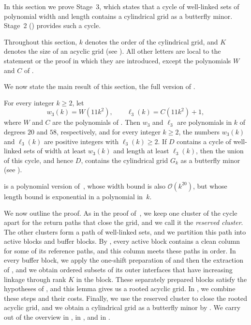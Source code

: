\documentclass[fontsize=12pt,leading=14pt]{fullpaper}
\newcounter{step}
\begin{document}
In this section we prove Stage~3, which states that a cycle of well-linked sets of polynomial width and length contains a cylindrical grid as a butterfly minor.
Stage~2 () provides such a cycle.

Throughout this section, $k$ denotes the order of the cylindrical grid, and $K$ denotes the size of an acyclic grid (see ).
All other letters are local to the statement or the proof in which they are introduced, except the polynomials $W$ and $C$ of .

We now state the main result of this section, the full version of .

\begin{theorem}[manual-num=\ref*{thm:intro-stage3}, note={Stage~3, full version}]\label{thm:stage3}
  For every integer $k\ge2$, let
  \begin{equation}\label{eq:s3-thresholds}
    w_3(k)=W(11k^2),\qquad\ell_3(k)=C(11k^2)+1,
  \end{equation}
  where $W$ and $C$ are the polynomials of .
  Then $w_3$ and $\ell_3$ are polynomials in $k$ of degrees $20$ and $58$, respectively, and for every integer $k\ge2$, the numbers $w_3(k)$ and $\ell_3(k)$ are positive integers with $\ell_3(k)\ge2$.
  If $D$ contains a cycle of well-linked sets of width at least $w_3(k)$ and length at least $\ell_3(k)$, then the union of this cycle, and hence $D$, contains the cylindrical grid $G_k$ as a butterfly minor (see ).
\end{theorem}

 is a polynomial version of~\cite[Theorem~3.18]{HKMM26b}, whose width bound is also $\mathcal{O}(k^{20})$, but whose length bound is exponential in a polynomial in~$k$.

We now outline the proof.
As in the proof of~\cite[Theorem~3.18]{HKMM26b}, we keep one cluster of the cycle apart for the return paths that close the grid, and we call it the \emph{reserved cluster}.
The other clusters form a path of well-linked sets, and we partition this path into active blocks and buffer blocks.
By , every active block contains a clean column for some of its reference paths, and this column meets these paths in order.
In every buffer block, we apply the one-shift preparation of  and then the extraction of , and we obtain ordered subsets of its outer interfaces that have increasing linkage through rank $K$ in the block.
These separately prepared blocks satisfy the hypotheses of , and this lemma gives us a rooted acyclic grid.
In , we combine these steps and their costs.
Finally, we use the reserved cluster to close the rooted acyclic grid, and we obtain a cylindrical grid as a butterfly minor by .
We carry out  of the overview in ,  in , and  in .
\end{document}
